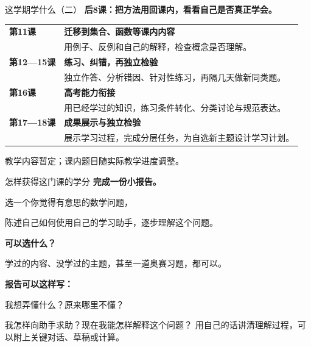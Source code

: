 \documentclass[aspectratio=169,10pt]{beamer}
\newcommand{\key}[1]{{\color{campusgreen}\bfseries #1}}
\newcommand{\smallbody}{\fontsize{11}{15}\selectfont}
\begin{document}
\begin{frame}[t,label=outlinetwo]{这学期学什么（二）}
  \smallbody
  \key{后8课：把方法用回课内，看看自己是否真正学会。}
  \par\vspace{3mm}
  \begin{tabular}{@{}lp{113mm}@{}}
    \key{第11课} & \textbf{迁移到集合、函数等课内内容}\\[1mm]
                  & 用例子、反例和自己的解释，检查概念是否理解。\\[2mm]
    \key{第12—15课} & \textbf{练习、纠错，再独立检验}\\[1mm]
                     & 独立作答、分析错因、针对性练习，再隔几天做新同类题。\\[2mm]
    \key{第16课} & \textbf{高考能力衔接}\\[1mm]
                  & 用已经学过的知识，练习条件转化、分类讨论与规范表达。\\[2mm]
    \key{第17—18课} & \textbf{成果展示与独立检验}\\[1mm]
                     & 展示学习过程，完成分层任务，为自选新主题设计学习计划。\\
  \end{tabular}
  \vfill
  {\fontsize{9}{12}\selectfont 教学内容暂定；课内题目随实际教学进度调整。}
\end{frame}

\begin{frame}[t]{怎样获得这门课的学分}
  \key{完成一份小报告。}
  \par\vspace{4mm}
  选一个你觉得有意思的数学问题，\par
  陈述自己如何使用自己的学习助手，逐步理解这个问题。
  \par\vspace{4mm}
  \textbf{可以选什么？}\par
  学过的内容、没学过的主题，甚至一道奥赛习题，都可以。
  \par\vspace{4mm}
  \textbf{报告可以这样写：}\par
  我想弄懂什么？原来哪里不懂？\par
  我怎样向助手求助？现在我能怎样解释这个问题？
  \vfill
  {\smallbody 用自己的话讲清理解过程，可以附上关键对话、草稿或计算。}
\end{frame}

\end{document}
